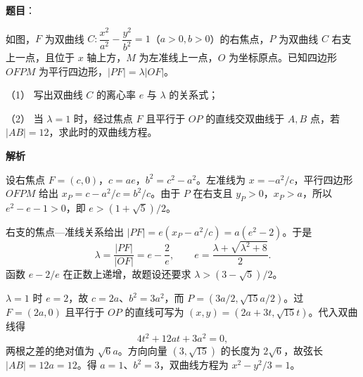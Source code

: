 \begin{answer}

\textbf{题目}：

如图，$F$ 为双曲线 $C:\dfrac{x^2}{a^2}-\dfrac{y^2}{b^2}=1$（$a>0,b>0$）的右焦点，$P$ 为双曲线 $C$ 右支上一点，且位于 $x$ 轴上方，$M$ 为左准线上一点，$O$ 为坐标原点。已知四边形 $OFPM$ 为平行四边形，$|PF|=\lambda|OF|$。

（1） 写出双曲线 $C$ 的离心率 $e$ 与 $\lambda$ 的关系式；

（2） 当 $\lambda=1$ 时，经过焦点 $F$ 且平行于 $OP$ 的直线交双曲线于 $A,B$ 点，若 $|AB|=12$，求此时的双曲线方程。
\nopagebreak[4]
\begin{center}\end{center}
\nopagebreak[4]
\textbf{解析}


设右焦点 $F=(c,0)$，$c=ae$，$b^2=c^2-a^2$。左准线为 $x=-a^2/c$，平行四边形 $OFPM$ 给出 $x_P=c-a^2/c=b^2/c$。由于 $P$ 在右支且 $y_P>0$，$x_P>a$，所以 $e^2-e-1>0$，即 $e>(1+\sqrt5)/2$。

右支的焦点—准线关系给出 $|PF|=e(x_P-a^2/c)=a(e^2-2)$。于是
\nopagebreak[4]
\[
\lambda=\frac{|PF|}{|OF|}=e-\frac2e,\qquad
e=\frac{\lambda+\sqrt{\lambda^2+8}}2.
\]
函数 $e-2/e$ 在正数上递增，故题设还要求 $\lambda>(3-\sqrt5)/2$。


$\lambda=1$ 时 $e=2$，故 $c=2a$、$b^2=3a^2$，而 $P=(3a/2,\sqrt{15}a/2)$。过 $F=(2a,0)$ 且平行于 $OP$ 的直线可写为 $(x,y)=(2a+3t,\sqrt{15}t)$。代入双曲线得
\nopagebreak[4]
\[
4t^2+12at+3a^2=0,
\]
两根之差的绝对值为 $\sqrt6a$。方向向量 $(3,\sqrt{15})$ 的长度为 $2\sqrt6$，故弦长 $|AB|=12a=12$。得 $a=1$、$b^2=3$，双曲线方程为 $x^2-y^2/3=1$。



\end{answer}